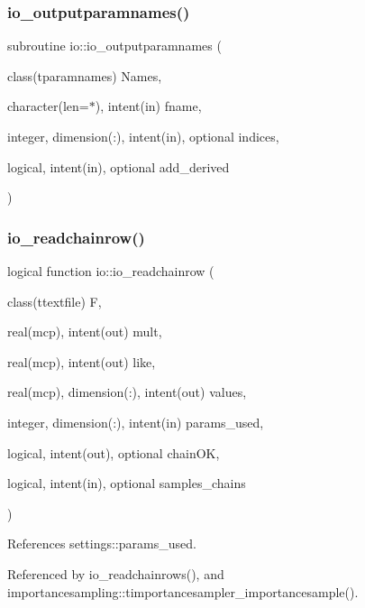 \subsubsection{\texorpdfstring{io\+\_\+outputparamnames()}{io\_outputparamnames()}}
{\footnotesize\ttfamily subroutine io\+::io\+\_\+outputparamnames (\begin{DoxyParamCaption}\item[{class(tparamnames)}]{Names,  }\item[{character(len=$\ast$), intent(in)}]{fname,  }\item[{integer, dimension(\+:), intent(in), optional}]{indices,  }\item[{logical, intent(in), optional}]{add\+\_\+derived }\end{DoxyParamCaption})}

\mbox{\label{namespaceio_a2ec9ab3b6936778533ec623b98d2b7b0}} 
\subsubsection{\texorpdfstring{io\+\_\+readchainrow()}{io\_readchainrow()}}
{\footnotesize\ttfamily logical function io\+::io\+\_\+readchainrow (\begin{DoxyParamCaption}\item[{class(ttextfile)}]{F,  }\item[{real(mcp), intent(out)}]{mult,  }\item[{real(mcp), intent(out)}]{like,  }\item[{real(mcp), dimension(\+:), intent(out)}]{values,  }\item[{integer, dimension(\+:), intent(in)}]{params\+\_\+used,  }\item[{logical, intent(out), optional}]{chain\+OK,  }\item[{logical, intent(in), optional}]{samples\+\_\+chains }\end{DoxyParamCaption})}



References settings\+::params\+\_\+used.



Referenced by io\+\_\+readchainrows(), and importancesampling\+::timportancesampler\+\_\+importancesample().

